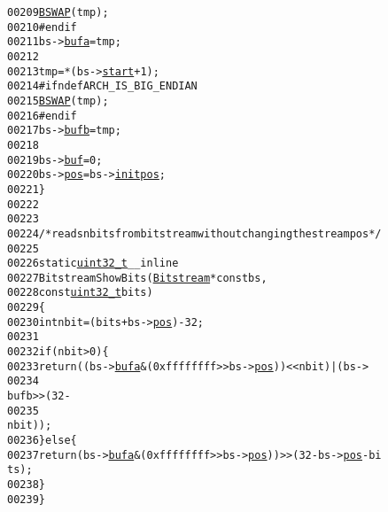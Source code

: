 \begin{footnotesize}
\begin{alltt}
00209 \textcolor{preprocessor}{}        \hyperlink{_macros_8h_acd886eee9738d4807d25c1baac1e839e}{BSWAP}(tmp);
00210 \textcolor{preprocessor}{#endif}
00211 \textcolor{preprocessor}{}        bs->\hyperlink{struct_bitstream_a2b3b7e703efb5f16a9b122862f6342ff}{bufa} = tmp;
00212 
00213         tmp = *(bs->\hyperlink{struct_bitstream_a4c2cb09a4fee7ed90d05f8b40914911e}{start} + 1);
00214 \textcolor{preprocessor}{#ifndef ARCH\_IS\_BIG\_ENDIAN}
00215 \textcolor{preprocessor}{}        \hyperlink{_macros_8h_acd886eee9738d4807d25c1baac1e839e}{BSWAP}(tmp);
00216 \textcolor{preprocessor}{#endif}
00217 \textcolor{preprocessor}{}        bs->\hyperlink{struct_bitstream_af88938159f6b589af03d736e9fe8119e}{bufb} = tmp;
00218 
00219         bs->\hyperlink{struct_bitstream_aa6e7d5fa7c3bcfaac4cda5c4b07f8aa1}{buf} = 0;
00220         bs->\hyperlink{struct_bitstream_ac7479c4c4e57d10bbfdd90baf6e731a4}{pos} = bs->\hyperlink{struct_bitstream_a3234ef24b4ec8a9d06731d4f2db67418}{initpos};
00221 \}
00222 
00223 
00224 \textcolor{comment}{/* reads n bits from bitstream without changing the stream pos */}
00225 
00226 \textcolor{keyword}{static} \hyperlink{_types_8h_a04909d1366bb244ff2482beb51635f37}{uint32_t} \_\_inline
00227 BitstreamShowBits(\hyperlink{struct_bitstream}{Bitstream} * \textcolor{keyword}{const} bs,
00228                                   \textcolor{keyword}{const} \hyperlink{_types_8h_a04909d1366bb244ff2482beb51635f37}{uint32_t} bits)
00229 \{
00230         \textcolor{keywordtype}{int} nbit = (bits + bs->\hyperlink{struct_bitstream_ac7479c4c4e57d10bbfdd90baf6e731a4}{pos}) - 32;
00231 
00232         \textcolor{keywordflow}{if} (nbit > 0) \{
00233                 \textcolor{keywordflow}{return} ((bs->\hyperlink{struct_bitstream_a2b3b7e703efb5f16a9b122862f6342ff}{bufa} & (0xffffffff >> bs->\hyperlink{struct_bitstream_ac7479c4c4e57d10bbfdd90baf6e731a4}{pos})) << nbit) | (bs->
00234                                                                                                                                  
      bufb >> (32 -
00235                                                                                                                                                  
       nbit));
00236         \} \textcolor{keywordflow}{else} \{
00237                 \textcolor{keywordflow}{return} (bs->\hyperlink{struct_bitstream_a2b3b7e703efb5f16a9b122862f6342ff}{bufa} & (0xffffffff >> bs->\hyperlink{struct_bitstream_ac7479c4c4e57d10bbfdd90baf6e731a4}{pos})) >> (32 - bs->\hyperlink{struct_bitstream_ac7479c4c4e57d10bbfdd90baf6e731a4}{pos} - bi
      ts);
00238         \}
00239 \}

\end{alltt}
\end{footnotesize}
